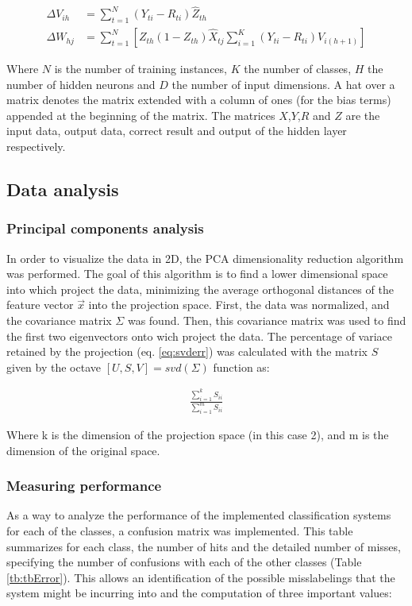 \documentclass{article}
\begin{document}
\begin{align}
\Delta V_{ih} &= \sum_{t=1}^{N}{(Y_{ti} - R_{ti}) \hat{Z}_{th}} \label{eq:gradV} \\ 
\Delta W_{hj} &= \sum_{t=1}^{N}{ 
    \left[ Z_{th}(1 - Z_{th})\hat{X}_{tj} \sum_{i=1}^{K}{ (Y_{ti} - R_{ti})V_{i(h+1)} } \right]
}  \label{eq:gradW}
\end{align}

Where $N$ is the number of training instances, $K$ the number of classes, $H$ the number of hidden neurons 
and $D$ the number of input dimensions. A hat over a matrix denotes the matrix extended with a column of
ones (for the bias terms) appended at the beginning of the matrix. The matrices $X$,$Y$,$R$ and $Z$ are
the input data, output data, correct result and output of the hidden layer respectively.

\subsection{Data analysis}

\subsubsection{Principal components analysis}
In order to visualize the data in 2D, the PCA dimensionality reduction algorithm was performed.
The goal of this algorithm is to find a lower dimensional space into which project the data, minimizing
the average orthogonal distances of the feature vector $\vec{x}$ into the projection space. First, the data
was normalized, and the covariance matrix $\Sigma$ was found. Then, this covariance matrix was used to find the
first two eigenvectors onto wich project the data. The percentage of variace retained by the projection 
(eq. \ref{eq:svderr}) was calculated with the matrix $S$ given by the octave $[U,S,V] = svd(\Sigma)$ function as:

\begin{align}
\frac{\sum_{i=1}^{k}S_{ii}}{\sum_{i=1}^{m}S_{ii}} \label{eq:svderr}
\end{align}

Where k is the dimension of the projection space (in this case 2), and m is the dimension of the original space.

\subsubsection{Measuring performance}
\label{sub:measures}
As a way to analyze the performance of the implemented classification systems for each of the classes, 
a confusion matrix was implemented. 
This table summarizes for each class, the number of hits and the detailed number of misses, specifying 
the number of confusions with each of the other classes (Table \ref{tb:tbError}).
This allows an identification of the possible misslabelings that the system might be incurring into and
the computation of three important values:
\end{document}
